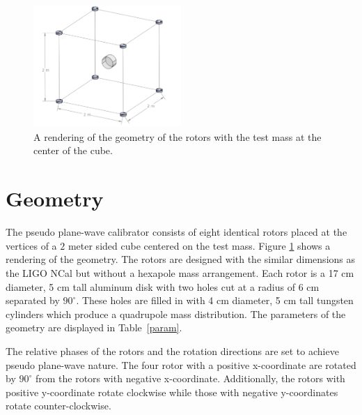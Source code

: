 \documentclass[superscriptaddress, twocolumn, prd]{revtex4-1}
\begin{document}
\begin{figure}[!h]
\centering \includegraphics[width=0.5\textwidth]{Super8_Model.pdf}
\caption{A rendering of the geometry of the rotors with the test mass at the center of the cube.}
\label{cad} 
\end{figure}

\section{Geometry}

The pseudo plane-wave calibrator consists of eight identical rotors placed at the vertices of a $2$ meter sided cube centered on the test mass. Figure \ref{cad} shows a rendering of the geometry. The rotors are designed with the similar dimensions as the LIGO NCal \cite{ncal} but without a hexapole mass arrangement. Each rotor is a 17 cm diameter, 5 cm tall aluminum disk with two holes cut at a radius of 6 cm separated by $90^\circ$. These holes are filled in with 4 cm diameter, 5 cm tall  tungsten cylinders which produce a quadrupole mass distribution. The parameters of the geometry are displayed in Table~\ref{param}.

The relative phases of the rotors and the rotation directions are set to achieve pseudo plane-wave nature. The four rotor with a positive x-coordinate are rotated by $90^\circ$ from the rotors with negative x-coordinate. Additionally, the rotors with positive y-coordinate rotate clockwise while those with negative y-coordinates rotate counter-clockwise. 
\end{document}

